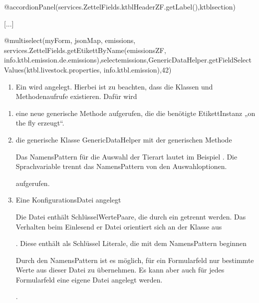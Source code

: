 \documentclass[letterpaper,10pt,ngerman]{sphinxmanual}
\begin{document}
\begin{sphinxVerbatim}[commandchars=\\\{\}]
@accordionPanel(services.ZettelFields.ktblHeaderZF.getLabel(),\PYGZdq{}ktbl\PYGZhy{}section\PYGZdq{})\PYGZob{}

        [...]

        @multiselect(myForm, jsonMap, \PYGZdq{}emissions\PYGZdq{}, services.ZettelFields.getEtikettByName(\PYGZdq{}emissionsZF\PYGZdq{}, \PYGZdq{}info.ktbl.emission.de.emissions\PYGZdq{}),\PYGZdq{}select\PYGZhy{}emissions\PYGZdq{},GenericDataHelper.getFieldSelectValues(\PYGZdq{}ktbl.livestock.properties\PYGZdq{}, \PYGZdq{}info.ktbl.emission\PYGZdq{}),42)
         
\PYGZcb{}
\end{sphinxVerbatim}
\begin{enumerate}
%
\item {} 
Ein  wird angelegt. Hierbei ist zu beachten, dass die Klassen und Methodenaufrufe existieren. Dafür wird

\end{enumerate}
\begin{enumerate}
%
\item {} 
eine neue generische Methode  aufgerufen, die die benötigte Etikett\sphinxhyphen{}Instanz „on the fly erzeugt“.

\item {} 
die generische Klasse GenericDataHelper mit der generischen Methode  %
\begin{footnote}[1]\sphinxAtStartFootnote
Das NamensPattern für die Auswahl der Tierart lautet im Beispiel . Die Sprachvariable trennt das NamensPattern von den Auswahloptionen.
%
\end{footnote}  aufgerufen.

\item {} 
Eine Konfigurations\sphinxhyphen{}Datei  angelegt %
\begin{footnote}[2]\sphinxAtStartFootnote
Die Datei enthält Schlüssel\sphinxhyphen{}Werte\sphinxhyphen{}Paare, die durch ein \sphinxcode{\sphinxupquote{=}} getrennt werden. Das Verhalten beim Einlesend er Datei orientiert sich an der \sphinxhyphen{}Klasse aus 
%
\end{footnote}. Diese enthält als Schlüssel Literale, die mit dem NamensPattern beginnen %
\begin{footnote}[3]\sphinxAtStartFootnote
Durch den NamensPattern ist es möglich, für ein Formularfeld nur bestimmte Werte aus dieser Datei zu übernehmen. Es kann aber auch für jedes Formularfeld eine eigene Datei angelegt werden.
%
\end{footnote}.

\end{enumerate}
\end{document}
